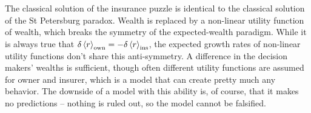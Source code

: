 %
%
The classical solution of the insurance puzzle is identical to the classical solution of the St Petersburg paradox.
Wealth is replaced by a non-linear utility function of wealth, which breaks the symmetry of the 
expected-wealth paradigm. While it is always true that $\delta\left\langle r \right\rangle_\text{own}=-\delta\left\langle r \right\rangle_\text{ins}$, 
the expected growth rates of non-linear utility functions don't share this anti-symmetry. A difference in 
the decision makers' wealths is sufficient, though often different utility functions are assumed for owner and insurer, 
which is a model that can create pretty much any behavior. The downside of a model with this ability is, of course, 
that it makes no predictions -- nothing is ruled out, so the model cannot be falsified.
%
